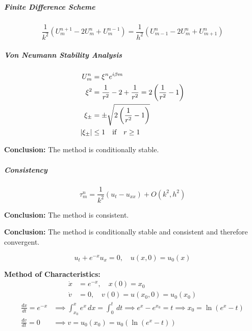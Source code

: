 \subparagraph{Finite Difference Scheme}
\[
  \frac{1}{k^2}\left( U_m^{n+1} - 2U_m^n + U_m^{n-1} \right) = \frac{1}{h^2}\left( U_{m-1}^n - 2U_m^n + U_{m+1}^n \right)
\]

\subparagraph{Von Neumann Stability Analysis}
\begin{align*}
  U_m^n         & = \xi^n e^{i\beta m}                                                    \\
  \xi^2         & = \frac{1}{r^2} - 2 + \frac{1}{r^2} = 2\left( \frac{1}{r^2} - 1 \right) \\
  \xi_\pm       & = \pm \sqrt{2\left( \frac{1}{r^2} - 1 \right)}                          \\
  \lvert\xi_\pm\rvert & \leq 1 \quad \text{if} \quad r \geq 1
\end{align*}

\textbf{Conclusion:} The method is conditionally stable.

\subparagraph{Consistency}
\[
  \tau_m^n = \frac{1}{k^2}\left( u_t - u_{xx} \right) + O(k^2, h^2)
\]

\textbf{Conclusion:} The method is consistent.

\textbf{Conclusion:} The method is conditionally stable and consistent and therefore convergent.


\begin{example}{}{}

  \[
    u_t + e^{-x}u_x = 0, \quad u(x,0) = u_0(x)
  \]

  \bf{Method of Characteristics:}
  \begin{align*}
    \dot{x} & = e^{-x}, \quad x(0) = x_0             \\
    \dot{v} & = 0, \quad v(0) = u(x_0, 0) = u_0(x_0)
  \end{align*}
  \begin{align*}
    \frac{dx}{dt} = e^{-x} & \implies \int_{x_0}^x e^x \, dx = \int_0^t \, dt \implies e^x - e^{x_0} = t \implies x_0 = \ln(e^x - t) \\
    \frac{dv}{dt} = 0      & \implies v = u_0(x_0) = u_0(\ln(e^x - t))
  \end{align*}

\end{example}
